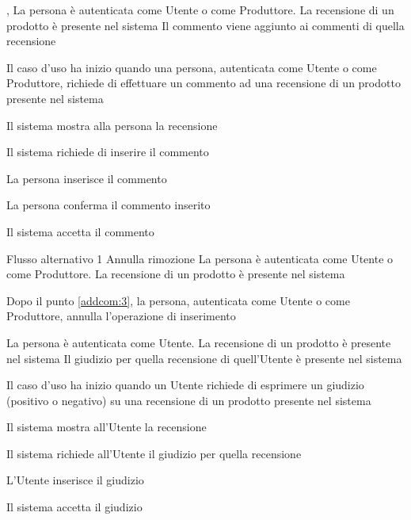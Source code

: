 \tabcuvspace

{, }
{La persona è autenticata come Utente o come Produttore. La recensione di un prodotto è presente nel sistema}
{Il commento viene aggiunto ai commenti di quella recensione}
{\begin{enumCU}
	\item Il caso d'uso ha inizio quando una persona, autenticata come Utente o come Produttore, richiede di effettuare un commento ad una recensione di un prodotto presente nel sistema
	\item Il sistema mostra alla persona la recensione
	\item Il sistema richiede di inserire il commento 
	\item La persona inserisce il commento \label{addcom:3}
	\item La persona conferma il commento inserito
	\item Il sistema accetta il commento
\end{enumCU}}
%
{Flusso alternativo 1}%
{Annulla rimozione}%
{La persona è autenticata come Utente o come Produttore. La recensione di un prodotto è presente nel sistema}
{\postNulle}%
{\begin{enumCU}
		\item Dopo il punto \ref{addcom:3}, la persona, autenticata come Utente o come Produttore, annulla l'operazione di inserimento
	\end{enumCU}}%

\tabcuvspace

{}{La persona è autenticata come Utente. La recensione di un prodotto è presente nel sistema}
{Il giudizio per quella recensione di quell'Utente è presente nel sistema}
{\begin{enumCU}
	\item Il caso d'uso ha inizio quando un Utente richiede di esprimere un giudizio (positivo o negativo) su una recensione di un prodotto presente nel sistema
	\item Il sistema mostra all'Utente la recensione
	\item Il sistema richiede all'Utente il giudizio per quella recensione
	\item L'Utente inserisce il giudizio
	\item Il sistema accetta il giudizio
\end{enumCU}}



